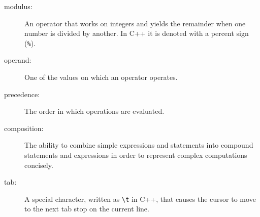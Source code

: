 \begin{description}
\item[modulus:]  An operator that works on integers and yields
the remainder when one number is divided by another.  In C++
it is denoted with a percent sign ({\tt \%}).

\item[operand:] One of the values on which an operator operates. 

\item[precedence:] The order in which operations are evaluated.

\item[composition:] The ability to combine simple
expressions and statements into compound statements and expressions
in order to represent complex computations concisely.

\item[tab:] A special character, written as \verb+\t+ in C++,
that causes the cursor to move to the next tab stop on the
current line.


\end{description}


